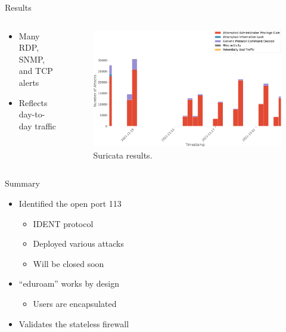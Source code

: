 \begin{frame}{Results}
    \begin{columns}
        \begin{column}{0.4\textwidth}
            {\footnotesize
            \begin{itemize}
                \item Many RDP, SNMP, and TCP alerts
                \item Reflects day-to-day traffic
            \end{itemize}
            }
        \end{column}
        \begin{column}{0.6\textwidth}
            \begin{figure}
                \centering
                \includegraphics[width=\textwidth]{img/madcat-suricata-alerts.pdf}
                \caption[Suricata results]{
                    Suricata results.
                }
                \label{fig:suricata-distribution}
            \end{figure}
        \end{column}
    \end{columns}
\end{frame}

\begin{frame}{Summary}
    \begin{itemize}
        \item Identified the open port 113
        \begin{itemize}
            \item IDENT protocol
            \item Deployed various attacks
            \item Will be closed soon
        \end{itemize}
        \item \enquote{eduroam} works by design
        \begin{itemize}
            \item Users are encapsulated
        \end{itemize}
        \item Validates the stateless firewall
    \end{itemize}
\end{frame}